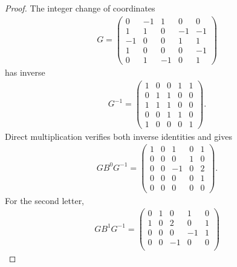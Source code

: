 \begin{proof}
    \leanok
    The integer change of coordinates
    \begin{align}
        G=\begin{pmatrix}
              0  & -1 & 1  & 0  & 0  \\
              1  & 1  & 0  & -1 & -1 \\
              -1 & 0  & 0  & 1  & 1  \\
              1  & 0  & 0  & 0  & -1 \\
              0  & 1  & -1 & 0  & 1
          \end{pmatrix}
        \label{eq:asymex_parity_gauge}
    \end{align}
    has inverse
    \begin{align}
        G^{-1}=\begin{pmatrix}
                   1 & 0 & 0 & 1 & 1 \\
                   0 & 1 & 1 & 0 & 0 \\
                   1 & 1 & 1 & 0 & 0 \\
                   0 & 0 & 1 & 1 & 0 \\
                   1 & 0 & 0 & 0 & 1
               \end{pmatrix}.
        \label{eq:asymex_parity_gauge_inv}
    \end{align}
    Direct multiplication verifies both inverse identities and gives
    \begin{align}
        GB^0G^{-1}
        =\begin{pmatrix}
             1 & 0 & 1  & 0 & 1 \\
             0 & 0 & 0  & 1 & 0 \\
             0 & 0 & -1 & 0 & 2 \\
             0 & 0 & 0  & 0 & 1 \\
             0 & 0 & 0  & 0 & 0
         \end{pmatrix}.
        \label{eq:asymex_parity_conj_zero}
    \end{align}
    For the second letter,
    \begin{align}
        GB^1G^{-1}
        =\begin{pmatrix}
             0 & 1 & 0  & 1  & 0 \\
             1 & 0 & 2  & 0  & 1 \\
             0 & 0 & 0  & -1 & 1 \\
             0 & 0 & -1 & 0  & 0 \\

\end{pmatrix}
\end{align}
\end{proof}
